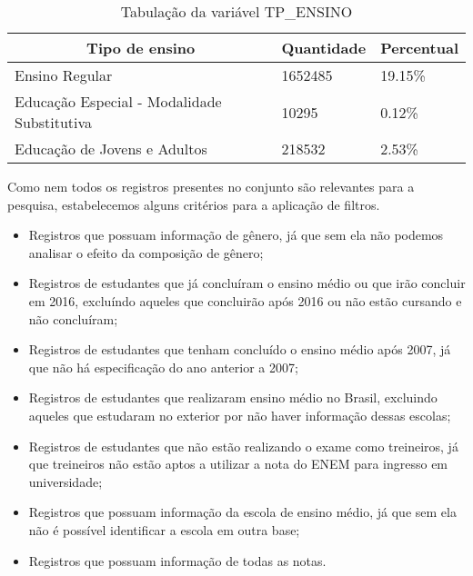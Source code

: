     \begin{table}[h]
      \begin{tabular}{lll}
      \hline
      \multicolumn{1}{c}{\textbf{Tipo de ensino}} & \multicolumn{1}{c}{\textbf{Quantidade}} & \multicolumn{1}{c}{\textbf{Percentual}} \\ \hline
      Ensino Regular                              & 1652485                                 & 19.15\%                                 \\ \hline
      Educação Especial - Modalidade Substitutiva & 10295                                   & 0.12\%                                  \\ \hline
      Educação de Jovens e Adultos                & 218532                                  & 2.53\%                                  \\ \hline
      \end{tabular}
      \caption{Tabulação da variável TP\_ENSINO}
      \label{tab:tipo-ensino}
      \end{table}

Como nem todos os registros presentes no conjunto são relevantes para a pesquisa, estabelecemos alguns critérios para a aplicação de filtros.
\begin{itemize}
  \item Registros que possuam informação de gênero, já que sem ela não podemos analisar o efeito da composição de gênero;
  \item Registros de estudantes que já concluíram o ensino médio ou que irão concluir em 2016, excluíndo aqueles que concluirão após 2016 ou não estão cursando e não concluíram; 
  \item Registros de estudantes que tenham concluído o ensino médio após 2007, já que não há especificação do ano anterior a 2007;
  \item Registros de estudantes que realizaram ensino médio no Brasil, excluindo aqueles que estudaram no exterior por não haver informação dessas escolas;
  \item Registros de estudantes que não estão realizando o exame como treineiros, já que treineiros não estão aptos a utilizar a nota do ENEM para ingresso em universidade;
  \item Registros que possuam informação da escola de ensino médio, já que sem ela não é possível identificar a escola em outra base;
  \item Registros que possuam informação de todas as notas.
\end{itemize}

